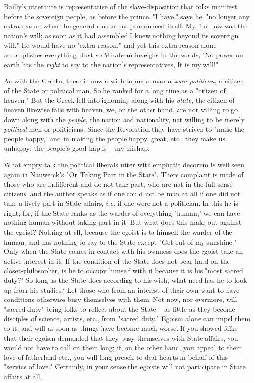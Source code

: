 \documentclass[a4paper]{book}
\begin{document}
Bailly's utterance is representative of the slave-disposition that folks 
manifest before the sovereign people, as before the prince. "{}I have,"{} says 
he, "{}no longer any extra reason when the general reason has pronounced 
itself. My first law was the nation's will; as soon as it had assembled I knew 
nothing beyond its sovereign will."{} He would have no "{}extra reason,"{} and 
yet this extra reason alone accomplishes everything. Just so Mirabeau inveighs 
in the words, "{}No power on earth has the \textit{right} to say to the 
nation's representatives, It is my will!"{}

As with the Greeks, there is now a wish to make man a \textit{zoon politicon}, 
a citizen of the State or political man. So he ranked for a long time as a 
"{}citizen of heaven."{} But the Greek fell into ignominy along with his 
\textit{State}, the citizen of heaven likewise falls with heaven; we, on the 
other hand, are not willing to go down along with the \textit{people}, the 
nation and nationality, not willing to be merely \textit{political} men or 
politicians. Since the Revolution they have striven to "{}make the people 
happy,"{} and in making the people happy, great, etc., they make us unhappy: 
the people's good hap is -- my mishap.

What empty talk the political liberals utter with emphatic decorum is well 
seen again in Nauwerck's "{}On Taking Part in the State"{}. There complaint is 
made of those who are indifferent and do not take part, who are not in the 
full sense citizens, and the author speaks as if one could not be man at all 
if one did not take a lively part in State affairs, \textit{i.e.} if one were 
not a politician. In this he is right; for, if the State ranks as the warder 
of everything "{}human,"{} we can have nothing human without taking part in 
it. But what does this make out against the egoist? Nothing at all, because 
the egoist is to himself the warder of the human, and has nothing to say to 
the State except "{}Get out of my sunshine."{} Only when the State comes in 
contact with his ownness does the egoist take an active interest in it. If the 
condition of the State does not bear hard on the closet-philosopher, is he to 
occupy himself with it because it is his "{}most sacred duty?"{} So long as 
the State does according to his wish, what need has he to look up from his 
studies? Let those who from an interest of their own want to have conditions 
otherwise busy themselves with them. Not now, nor evermore, will "{}sacred 
duty"{} bring folks to reflect about the State -- as little as they become 
disciples of science, artists, etc., from "{}sacred duty."{} Egoism alone can 
impel them to it, and will as soon as things have become much worse. If you 
showed folks that their egoism demanded that they busy themselves with State 
affairs, you would not have to call on them long; if, on the other hand, you 
appeal to their love of fatherland etc., you will long preach to deaf hearts 
in behalf of this "{}service of love."{} Certainly, in your sense the egoists 
will not participate in State affairs at all.
\end{document}
